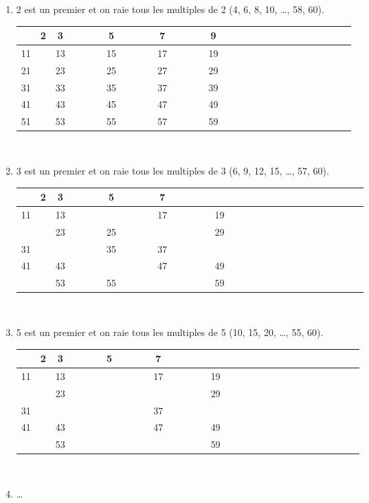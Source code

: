 \documentclass[letterpaper, 12pt]{article}
\begin{document}
\begin{enumerate}
\item 2 est un premier et on raie tous les multiples de 2 (4, 6, 8, 10, \dots, 58, 60).
\begin{center}
\begin{tabular}{|c|c|c|c|c|c|c|c|c|c|c|c|c|c|c|c|c|c|c|c|} \cline{2-10}
\multicolumn{1}{c|}{} & {\bf 2} & 3 & \ \ \ \ & 5 & \ \ \ \ & 7 & \ \ \ \ & 9 & \ \ \ \ \\ \hline
11 & \ & 13 & \ & 15 & \ & 17 & \ & 19 & \ \\ \hline
21 & \ & 23 & \ & 25 & \ & 27 & \ & 29 & \ \\ \hline
31 & \ & 33 & \ & 35 & \ & 37 & \ & 39 & \ \\ \hline
41 & \ & 43 & \ & 45 & \ & 47 & \ & 49 & \ \\ \hline
51 & \ & 53 & \ & 55 & \ & 57 & \ & 59 & \ \\ \hline
\end{tabular}\\
\end{center}
\item 3 est un premier et on raie tous les multiples de 3 (6, 9, 12, 15, \dots, 57, 60).
\begin{center}
\begin{tabular}{|c|c|c|c|c|c|c|c|c|c|c|c|c|c|c|c|c|c|c|c|} \cline{2-10}
\multicolumn{1}{c|}{} & {\bf 2} & {\bf 3} & \ \ \ \ & 5 & \ \ \ \ & 7 & \ \ \ \ & \ \ \ \ & \ \ \ \ \\ \hline
11 & \ & 13 & \ & \  & \ & 17 & \ & 19 & \ \\ \hline
 \ & \ & 23 & \ & 25 & \ & \  & \ & 29 & \ \\ \hline
31 & \ & \  & \ & 35 & \ & 37 & \ & \  & \ \\ \hline
41 & \ & 43 & \ & \  & \ & 47 & \ & 49 & \ \\ \hline
 \ & \ & 53 & \ & 55 & \ & \  & \ & 59 & \ \\ \hline
\end{tabular}\\
\end{center}
\item 5 est un premier et on raie tous les multiples de 5 (10, 15, 20, \dots, 55, 60).
\begin{center}
\begin{tabular}{|c|c|c|c|c|c|c|c|c|c|c|c|c|c|c|c|c|c|c|c|} \cline{2-10}
\multicolumn{1}{c|}{} & {\bf 2} & {\bf 3} & \ \ \ \ & {\bf 5} & \ \ \ \ & 7 & \ \ \ \ & \ \ \ \ & \ \ \ \ \\ \hline
11 & \ & 13 & \ & \ & \ & 17 & \ & 19 & \ \\ \hline
 \ & \ & 23 & \ & \ & \ & \  & \ & 29 & \ \\ \hline
31 & \ & \  & \ & \ & \ & 37 & \ & \  & \ \\ \hline
41 & \ & 43 & \ & \ & \ & 47 & \ & 49 & \ \\ \hline
 \ & \ & 53 & \ & \ & \ & \  & \ & 59 & \ \\ \hline
\end{tabular}\\
\end{center}
\item \dots\\
\end{enumerate}
\end{document}
